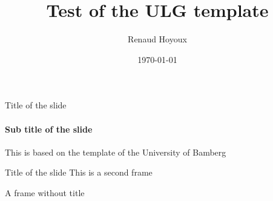 \documentclass{beamer}
\title{Test of the ULG template}
\author{Renaud Hoyoux}
\institute{My team - My Dept - University of Liège}
\date{\today}
\begin{document}
 \begin{frame}[plain]
	\titlepage
\end{frame}

\begin{frame}{Title of the slide}
\framesubtitle{Sub title of the slide}
This is based on the template of the University of Bamberg
\end{frame}

\begin{frame}{Title of the slide}
This is a second frame
\end{frame}

\begin{frame}
A frame without title
\end{frame}
\end{document}
